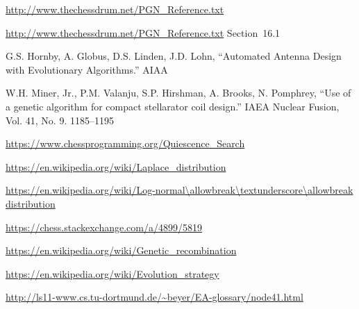 \documentclass[letterpaper]{article}
\renewcommand{\_}{\allowbreak\textunderscore\allowbreak}
\begin{document}
\begin{thebibliography}{99}

\url{http://www.thechessdrum.net/PGN_Reference.txt}

\url{http://www.thechessdrum.net/PGN_Reference.txt} Section~16.1

G.S. Hornby, A. Globus, D.S. Linden, J.D. Lohn, ``Automated Antenna Design with Evolutionary Algorithms.'' AIAA

W.H. Miner, Jr., P.M. Valanju, S.P. Hirshman, A. Brooks, N. Pomphrey, ``Use of a genetic algorithm for compact stellarator coil design.'' IAEA Nuclear Fusion, Vol. 41, No. 9. 1185--1195

\url{https://www.chessprogramming.org/Quiescence_Search}

\url{https://en.wikipedia.org/wiki/Laplace_distribution}

\url{https://en.wikipedia.org/wiki/Log-normal\_distribution}

\url{https://chess.stackexchange.com/a/4899/5819}

\url{https://en.wikipedia.org/wiki/Genetic_recombination}

\url{https://en.wikipedia.org/wiki/Evolution_strategy}

\url{http://ls11-www.cs.tu-dortmund.de/~beyer/EA-glossary/node41.html}

\end{thebibliography}
\end{document}
